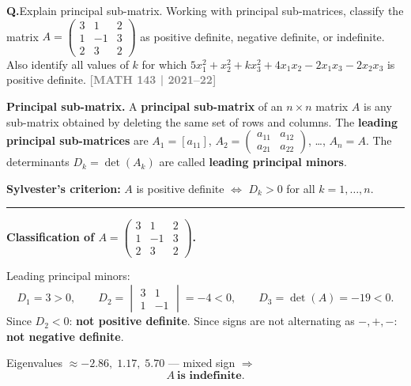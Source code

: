 \documentclass[12pt,a3paper]{article}
\newcommand{\yr}[1]{\hfill\textcolor{gray}{\small\textbf{[#1]}}}
\newcounter{qnum}
\newcommand{\Q}[1]{%
  \needspace{4\baselineskip}
  \refstepcounter{qnum}
  \vspace{6pt}
  \noindent\textbf{Q\theqnum.}\enspace #1\par
}
\begin{document}
\Q{Explain principal sub-matrix. Working with principal sub-matrices, classify the matrix $A = \begin{pmatrix} 3 & 1 & 2 \\ 1 & -1 & 3 \\ 2 & 3 & 2 \end{pmatrix}$ as positive definite, negative definite, or indefinite. Also identify all values of $k$ for which $5x_1^2 + x_2^2 + kx_3^2 + 4x_1x_2 - 2x_1x_3 - 2x_2x_3$ is positive definite.
\yr{MATH 143 | 2021--22}}


\begin{tcolorbox}[enhanced,breakable,
  colback=cE!4,colframe=cE,boxrule=0.8pt,arc=5pt,
  title={\textbf{Answer --- Principal Sub-matrices; Classify $A$; Find $k$}},
  fonttitle=\bfseries\color{white},colbacktitle=cE]

\textbf{Principal sub-matrix.} A \textbf{principal sub-matrix} of an $n\times n$ matrix $A$
is any sub-matrix obtained by deleting the same set of rows and columns.
The \textbf{leading principal sub-matrices} are $A_1=[a_{11}]$,
$A_2=\begin{pmatrix}a_{11}&a_{12}\\a_{21}&a_{22}\end{pmatrix}$, \ldots, $A_n=A$.
The determinants $D_k=\det(A_k)$ are called \textbf{leading principal minors}.

\textbf{Sylvester's criterion:}
$A$ is positive definite $\Leftrightarrow$ $D_k>0$ for all $k=1,\ldots,n$.

\medskip\textcolor{cE}{\rule{\textwidth}{0.4pt}}

\textbf{Classification of $A=\begin{pmatrix}3&1&2\\1&-1&3\\2&3&2\end{pmatrix}$.}

Leading principal minors:
\[
  D_1=3>0,\qquad D_2=\begin{vmatrix}3&1\\1&-1\end{vmatrix}=-4<0,\qquad D_3=\det(A)=-19<0.
\]
Since $D_2<0$: \textbf{not positive definite}. Since signs are not alternating as
$-,+,-$: \textbf{not negative definite}.

Eigenvalues $\approx-2.86,\;1.17,\;5.70$ — mixed sign $\Rightarrow$
\[
  \boxed{A\ \textbf{is indefinite}.}
\]


\end{tcolorbox}
\end{document}
